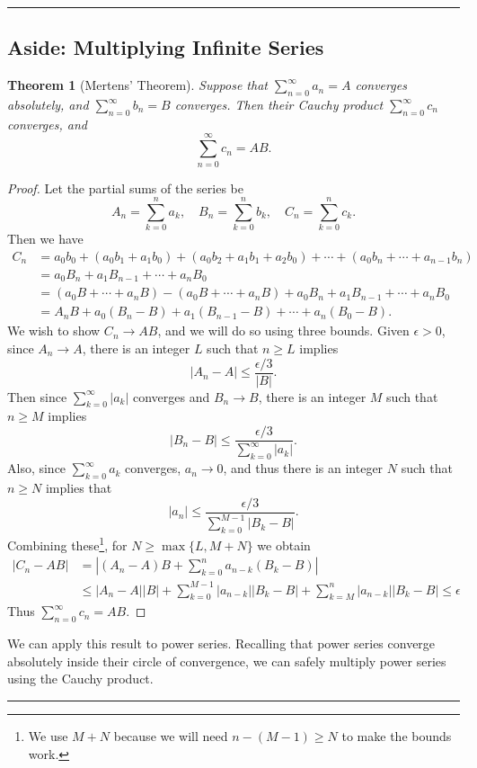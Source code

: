 \documentclass[11pt, a4paper]{article}
\newtheorem*{theorem*}{Theorem}
\theoremstyle{definition}
\newenvironment{aside}[1]{
	\noindent
    \rule{\textwidth}{0.025cm}
    \vspace{-1.75\baselineskip}
    \subsection*{#1}}
{\noindent\rule{\textwidth}{0.025cm}}
\begin{document}
\begin{aside}{Aside: Multiplying Infinite Series}
\begin{theorem*}[Mertens' Theorem]
	Suppose that $\sum_{n = 0}^{\infty} a_n = A$ converges absolutely, and $\sum_{n = 0}^{\infty} b_n = B$ converges. Then their Cauchy product $\sum_{n = 0}^{\infty} c_n$ converges, and 
	$$
	\sum_{n = 0}^{\infty} c_n = AB.
	$$
\end{theorem*}
\begin{proof}
	Let the partial sums of the series be
	$$
	A_n = \sum_{k = 0}^{n} a_k, \quad B_n = \sum_{k = 0}^{n} b_k, \quad C_n = \sum_{k = 0}^{n} c_k.
	$$
	Then we have
	\begin{align*}
		C_n &= a_0 b_0 + (a_0 b_1 + a_1 b_0) + (a_0 b_2 + a_1 b_1 + a_2 b_0) + \cdots + (a_0 b_n + \cdots + a_{n - 1} b_n) \\
		&= a_0 B_n + a_1 B_{n - 1} + \cdots + a_n B_0 \\
		&= (a_0 B + \cdots + a_n B) - (a_0 B + \cdots + a_n B) + a_0 B_n + a_1 B_{n - 1} + \cdots + a_n B_0 \\
		&= A_n B + a_0 (B_n - B) + a_1 (B_{n-1} - B) + \cdots + a_n(B_0 - B).
	\end{align*}
	We wish to show $C_n \rightarrow AB$, and we will do so using three bounds. Given $\epsilon > 0$, since $A_n \rightarrow A$, there is an integer $L$ such that $n \geq L$ implies
	$$
	|A_n - A| \leq \frac{\epsilon /3}{|B|}.
	$$
	Then since $\sum_{k = 0}^{\infty} |a_k|$ converges and $B_n \rightarrow B$, there is an integer $M$ such that $n \geq M$ implies
	$$
	|B_n - B| \leq \frac{\epsilon/3}{\sum_{k = 0}^{\infty} |a_k|}.
	$$
	Also, since $\sum_{k = 0}^{\infty} a_k$ converges, $a_n \rightarrow 0$, and thus there is an integer $N$ such that $n \geq N$ implies that
	$$
	|a_n| \leq \frac{\epsilon/3}{\sum_{k = 0}^{M-1} |B_k - B|}.
	$$
	Combining these\footnote{We use $M + N$ because we will need $n - (M - 1) \geq N$ to make the bounds work.}, for $N \geq \max\{L, M + N\}$ we obtain
	\begin{align*}
		|C_n - AB| &= \left|(A_n - A)B + \sum_{k = 0}^n a_{n - k} (B_k - B)\right| \\
		&\leq |A_n - A||B| + \sum_{k = 0}^{M - 1}|a_{n - k}| |B_k - B| + \sum_{k = M}^{n} |a_{n -k}| |B_{k} - B| \leq \epsilon
	\end{align*}
	Thus $\sum_{n = 0}^{\infty} c_n = AB$. \qedhere
\end{proof}

We can apply this result to power series. Recalling that power series converge absolutely inside their circle of convergence, we can safely multiply power series using the Cauchy product.


\end{aside}
\end{document}
